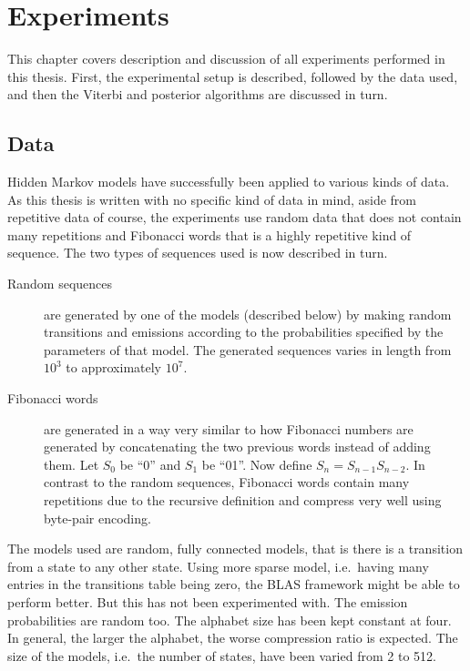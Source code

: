 \chapter{Experiments}
\label{cha:experiments}

This chapter covers description and discussion of all experiments performed in
this thesis.  First, the experimental setup is described, followed by the data
used, and then the Viterbi and posterior algorithms are discussed in turn.

\section{Data}

Hidden Markov models have successfully been applied to various kinds of
data.  As this thesis is written with no specific kind of data in mind, aside
from repetitive data of course, the experiments use random data that does not
contain many repetitions and Fibonacci words that is a highly repetitive kind
of sequence.  The two types of sequences used is now described in turn.

\begin{description}
\item[Random sequences] are generated by one of the models (described below) by
  making random transitions and emissions according to the probabilities
  specified by the parameters of that model.  The generated sequences varies in
  length from $10^3$ to approximately $10^7$.
\item[Fibonacci words] are generated in a way very similar to how Fibonacci
  numbers are generated by concatenating the two previous words instead of
  adding them.  Let $S_0$ be ``0'' and $S_1$ be ``01''.  Now define
  $S_n=S_{n-1}S_{n-2}$. In contrast to the random sequences, Fibonacci words
  contain many repetitions due to the recursive definition and compress very
  well using byte-pair encoding.
\end{description}

The models used are random, fully connected models, that is there is a
transition from a state to any other state. Using more sparse model, i.e.\
having many entries in the transitions table being zero, the BLAS framework
might be able to perform better. But this has not been experimented with. The
emission probabilities are random too. The alphabet size has been kept constant
at four. In general, the larger the alphabet, the worse compression ratio is
expected. The size of the models, i.e.\ the number of states, have been varied
from 2 to 512.

